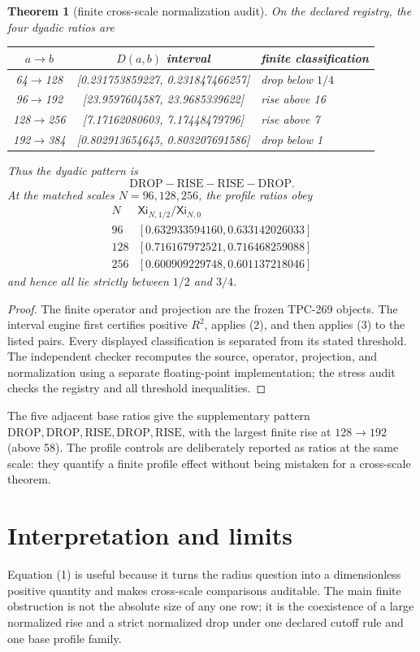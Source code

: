 \documentclass[11pt]{article}
\newtheorem{theorem}{Theorem}
\newcommand{\XiN}{\mathsf{Xi}}
\begin{document}
\begin{theorem}[finite cross-scale normalization audit]
On the declared registry, the four dyadic ratios are
\begin{center}
\begin{tabular}{ccl}
\(a\to b\)& \(D(a,b)\) interval & finite classification\\
\midrule
64\(\to\)128 & [0.231753859227, 0.231847466257] & drop below \(1/4\)\\
96\(\to\)192 & [23.9597604587, 23.9685339622] & rise above 16\\
128\(\to\)256 & [7.17162080603, 7.17448479796] & rise above 7\\
192\(\to\)384 & [0.802913654645, 0.803207691586] & drop below 1\\
\end{tabular}
\end{center}
Thus the dyadic pattern is
\[
 \mathrm{DROP\!-\!RISE\!-\!RISE\!-\!DROP}.
\]
At the matched scales \(N=96,128,256\), the profile ratios obey
\[
\begin{array}{c|c}
N&\XiN_{N,1/2}/\XiN_{N,0}\\ \hline
96 &[0.632933594160,0.633142026033]\\
128 &[0.716167972521,0.716468259088]\\
256 &[0.600909229748,0.601137218046]
\end{array}
\]
and hence all lie strictly between \(1/2\) and \(3/4\).
\end{theorem}
\begin{proof}
The finite operator and projection are the frozen TPC-269 objects. The interval
engine first certifies positive \(R^2\), applies (2), and then applies (3) to
the listed pairs. Every displayed classification is separated from its stated
threshold. The independent checker recomputes the source, operator, projection,
and normalization using a separate floating-point implementation; the stress
audit checks the registry and all threshold inequalities.
\end{proof}

The five adjacent base ratios give the supplementary pattern
\(\mathrm{DROP, DROP, RISE, DROP, RISE}\), with the largest finite rise at
\(128\to192\) (above 58). The profile controls are deliberately reported as
ratios at the same scale: they quantify a finite profile effect without being
mistaken for a cross-scale theorem.

\section{Interpretation and limits}
Equation (1) is useful because it turns the radius question into a dimensionless
positive quantity and makes cross-scale comparisons auditable. The main finite
obstruction is not the absolute size of any one row; it is the coexistence of a
large normalized rise and a strict normalized drop under one declared cutoff
rule and one base profile family.
\end{document}
